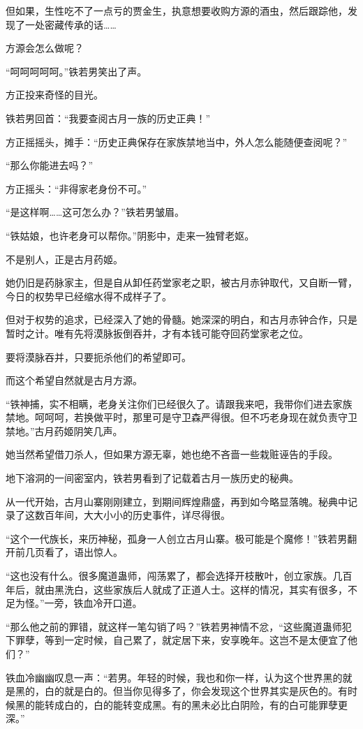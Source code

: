 \begin{this_body}
但如果，生性吃不了一点亏的贾金生，执意想要收购方源的酒虫，然后跟踪他，发现了一处密藏传承的话……

方源会怎么做呢？

“呵呵呵呵呵。”铁若男笑出了声。

方正投来奇怪的目光。

铁若男回首：“我要查阅古月一族的历史正典！”

方正摇摇头，摊手：“历史正典保存在家族禁地当中，外人怎么能随便查阅呢？”

“那么你能进去吗？”

方正摇头：“非得家老身份不可。”

“是这样啊……这可怎么办？”铁若男皱眉。

“铁姑娘，也许老身可以帮你。”阴影中，走来一独臂老妪。

不是别人，正是古月药姬。

她仍旧是药脉家主，但是自从卸任药堂家老之职，被古月赤钟取代，又自断一臂，今日的权势早已经缩水得不成样子了。

但对于权势的追求，已经深入了她的骨髓。她深深的明白，和古月赤钟合作，只是暂时之计。唯有先将漠脉扳倒吞并，才有本钱可能夺回药堂家老之位。

要将漠脉吞并，只要扼杀他们的希望即可。

而这个希望自然就是古月方源。

“铁神捕，实不相瞒，老身关注你们已经很久了。请跟我来吧，我带你们进去家族禁地。呵呵呵，若换做平时，那里可是守卫森严得很。但不巧老身现在就负责守卫禁地。”古月药姬阴笑几声。

她当然希望借刀杀人，但如果方源无辜，她也绝不吝啬一些栽赃诬告的手段。

地下溶洞的一间密室内，铁若男看到了记载着古月一族历史的秘典。

从一代开始，古月山寨刚刚建立，到期间辉煌鼎盛，再到如今略显落魄。秘典中记录了这数百年间，大大小小的历史事件，详尽得很。

“这个一代族长，来历神秘，孤身一人创立古月山寨。极可能是个魔修！”铁若男翻开前几页看了，语出惊人。

“这也没有什么。很多魔道蛊师，闯荡累了，都会选择开枝散叶，创立家族。几百年后，就由黑洗白，这些家族后人就成了正道人士。这样的情况，其实有很多，不足为怪。”一旁，铁血冷开口道。

“那么他之前的罪错，就这样一笔勾销了吗？”铁若男神情不忿，“这些魔道蛊师犯下罪孽，等到一定时候，自己累了，就定居下来，安享晚年。这岂不是太便宜了他们？”

铁血冷幽幽叹息一声：“若男。年轻的时候，我也和你一样，认为这个世界黑的就是黑的，白的就是白的。但当你见得多了，你会发现这个世界其实是灰色的。有时候黑的能转成白的，白的能转变成黑。有的黑未必比白阴险，有的白可能罪孽更深。”


\end{this_body}
